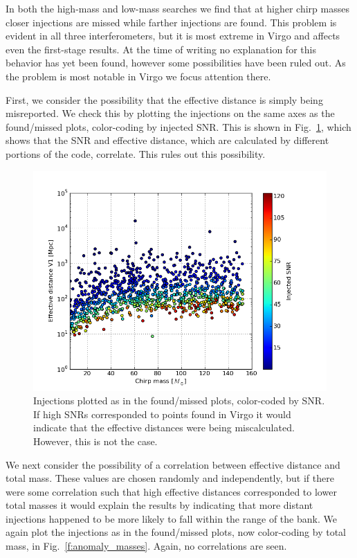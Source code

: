 In both the high-mass and low-mass searches we find that at higher
chirp masses closer injections are missed while farther injections are
found.  This problem is evident in all three interferometers, but it
is most extreme in Virgo and affects even the first-stage results.  At
the time of writing no explanation for this behavior has yet been
found, however some possibilities have been ruled out.  As the problem
is most notable in Virgo we focus attention there.

First, we consider the possibility that the effective distance is
simply being misreported.  We check this by plotting the injections on
the same axes as the found/missed plots, color-coding by injected SNR.
This is shown in Fig.~\ref{f:anomaly_snrs}, which shows that the SNR
and effective distance, which are calculated by different portions of
the code, correlate.  This rules out this possibility.

\begin{figure}
  \includegraphics[width=\linewidth]{figures/ninja2_results/anomaly_snrs}
  \caption[Injections color-coded by SNR]{
  \label{f:anomaly_snrs}
Injections plotted as in the found/missed plots, color-coded by SNR.
If high SNRs corresponded to points found in Virgo it would indicate
that the effective distances were being miscalculated.  However, this
is not the case.
}
\end{figure}%

We next consider the possibility of a correlation between effective
distance and total mass.  These values are chosen randomly and
independently, but if there were some correlation such that high
effective distances corresponded to lower total masses it would
explain the results by indicating that more distant injections
happened to be more likely to fall within the range of the bank.
We again plot the injections as in the found/missed plots, now
color-coding by total mass, in Fig.~\ref{f:anomaly_masses}.  Again,
no correlations are seen.


